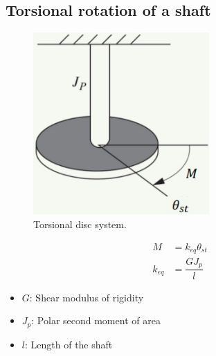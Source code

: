 \subsection{Torsional rotation of a shaft}
\begin{figure}[H]
    \centering
    \includegraphics[width = 0.6\textwidth]{./img/diagram20.jpg}
    \caption{Torsional disc system.}
\end{figure}
\begin{align}
    M      & = k_{eq} \theta_{st} \\
    k_{eq} & = \dfrac{GJ_p}{l}
\end{align}
\begin{itemize}
    \item $G$: Shear modulus of rigidity
    \item $J_p$: Polar second moment of area
    \item $l$: Length of the shaft
\end{itemize}